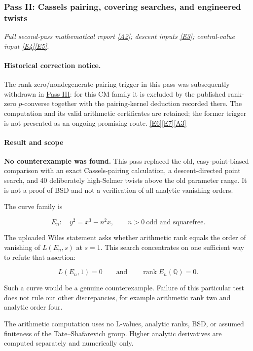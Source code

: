 \documentclass[11pt]{article}
\newcommand{\srcref}[1]{\hyperlink{source:#1}{[#1]}}
\begin{document}
\subsubsection{Pass II: Cassels pairing, covering searches, and engineered twists}\label{pass2}
\textit{Full second-pass mathematical report \srcref{A2}; descent inputs \srcref{E3}; central-value input \srcref{E4}\srcref{E5}.}

\paragraph{Historical correction notice.}
The rank-zero/nondegenerate-pairing trigger in this pass was subsequently
withdrawn in \hyperref[pass3]{Pass III}: for this CM family it is excluded by the
published rank-zero $p$-converse together with the pairing-kernel deduction
recorded there. The computation and its valid arithmetic certificates are
retained; the former trigger is not presented as an ongoing promising route.
\srcref{E6}\srcref{E7}\srcref{A3}

\paragraph{Result and scope}

\textbf{No counterexample was found.} This pass replaced the old, easy-point-biased comparison with an exact Cassels-pairing calculation, a descent-directed point search, and 40 deliberately high-Selmer twists above the old parameter range. It is not a proof of BSD and not a verification of all analytic vanishing orders.

The curve family is

\[E_n:\quad y^2=x^3-n^2x,\qquad n>0\ \text{odd and squarefree}.\]

The uploaded Wiles statement asks whether arithmetic rank equals the order of vanishing of \(L(E_n,s)\) at \(s=1\). This search concentrates on one sufficient way to refute that assertion:

\[L(E_n,1)=0\qquad\text{and}\qquad\operatorname{rank}E_n(\mathbb Q)=0.\]

Such a curve would be a genuine counterexample. Failure of this particular test does not rule out other discrepancies, for example arithmetic rank two and analytic order four.

The arithmetic computation uses no L-values, analytic ranks, BSD, or assumed finiteness of the Tate--Shafarevich group. Higher analytic derivatives are computed separately and numerically only.
\end{document}
